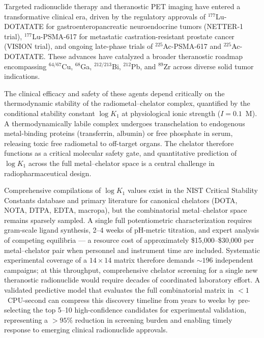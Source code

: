 \documentclass[journal=jacsat,manuscript=article]{achemso}
\begin{document}
Targeted radionuclide therapy and theranostic PET imaging have entered a transformative
clinical era, driven by the regulatory approvals of $^{177}$Lu-DOTATATE for
gastroenteropancreatic neuroendocrine tumors (NETTER-1 trial),\cite{Strosberg2017}
$^{177}$Lu-PSMA-617 for metastatic castration-resistant prostate cancer (VISION trial),\cite{Sartor2021}
and ongoing late-phase trials of $^{225}$Ac-PSMA-617\cite{Kratochwil2016} and
$^{225}$Ac-DOTATATE.\cite{Ballal2020}
These advances have catalyzed a broader theranostic roadmap encompassing
$^{64/67}$Cu, $^{68}$Ga, $^{212/213}$Bi, $^{212}$Pb, and $^{89}$Zr across
diverse solid tumor indications.\cite{Bodei2022,Herrmann2020,Morgan2023}

The clinical efficacy and safety of these agents depend critically on the thermodynamic
stability of the radiometal--chelator complex, quantified by the conditional stability
constant $\log K_1$ at physiological ionic strength ($I = 0.1$~M).
A thermodynamically labile complex undergoes transchelation to endogenous metal-binding
proteins (transferrin, albumin) or free phosphate in serum, releasing toxic free
radiometal to off-target organs.\cite{Price2014,Wadas2010,Ramogida2013}
The chelator therefore functions as a critical molecular safety gate, and
quantitative prediction of $\log K_1$ across the full metal--chelator space is a
central challenge in radiopharmaceutical design.\cite{Boros2019,Hu2022}

Comprehensive compilations of $\log K_1$ values exist in the NIST Critical Stability
Constants database\cite{MartellSmith2004} and primary literature for canonical
chelators (DOTA,\cite{deLeonRodriguez2008} NOTA,\cite{Notni2010}
DTPA,\cite{Pniok2014} EDTA, macropa\cite{Blei2023,RocaSabio2009}), but the
combinatorial metal--chelator space remains sparsely sampled.
A single full potentiometric characterization requires gram-scale ligand synthesis,
2--4 weeks of pH-metric titration, and expert analysis of competing equilibria ---
a resource cost of approximately \$15,000--\$30,000 per metal--chelator pair when
personnel and instrument time are included.\cite{Leavitt2001}
Systematic experimental coverage of a $14 \times 14$ matrix therefore demands
$\sim 196$ independent campaigns; at this throughput, comprehensive chelator
screening for a single new theranostic radionuclide would require decades of
coordinated laboratory effort.
A validated predictive model that evaluates the full combinatorial matrix in
$< 1$~CPU-second can compress this discovery timeline from years to weeks by
pre-selecting the top 5--10 high-confidence candidates for experimental validation,
representing a $> 95\%$ reduction in screening burden and enabling timely
response to emerging clinical radionuclide approvals.
\end{document}

